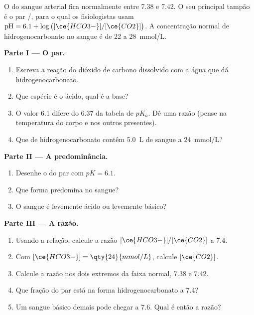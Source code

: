 \begin{problem}
\label{pb:g12:buffers-predominance:1}
O  do sangue arterial fica normalmente entre 7.38 e 7.42. O seu
principal tampão é o par /, para o qual os
fisiologistas usam $\mathrm{pH} = 6.1 + \log\big([\ce{HCO3-}]/[\ce{CO2}]\big)$.
A concentração normal de hidrogenocarbonato no sangue é de 22 a
\qty{28}{mmol/L}.

\medskip
\noindent\textbf{Parte I --- O par.}
\begin{enumerate}
  \item Escreva a reação do dióxido de carbono dissolvido com a água que
        dá  hidrogenocarbonato.
  \item Que espécie é o ácido, qual é a base?
  \item O valor 6.1 difere do 6.37 da tabela de $pK_a$. Dê uma razão
        (pense na temperatura do corpo e nos outros  presentes).
  \item Que  de hidrogenocarbonato contêm
        \qty{5.0}{L} de sangue a \qty{24}{mmol/L}?
\end{enumerate}

\medskip
\noindent\textbf{Parte II --- A predominância.}
\begin{enumerate}[resume]
  \item Desenhe o  do par com $pK = 6.1$.
  \item Que forma predomina no sangue?
  \item O sangue é levemente ácido ou levemente básico?
\end{enumerate}

\medskip
\noindent\textbf{Parte III --- A razão.}
\begin{enumerate}[resume]
  \item Usando a relação, calcule a razão $[\ce{HCO3-}]/[\ce{CO2}]$ a
         7.4.
  \item Com $[\ce{HCO3-}] = \qty{24}{mmol/L}$, calcule $[\ce{CO2}]$.
  \item Calcule a razão nos dois extremos da faixa normal, 7.38 e 7.42.
  \item Que fração do par está na forma hidrogenocarbonato a  7.4?
  \item Um sangue básico demais pode chegar a  7.6. Qual é então a
        razão?
\end{enumerate}


\end{problem}
